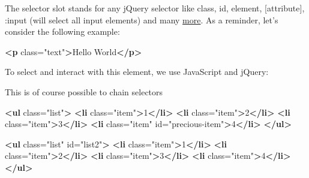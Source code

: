 \documentclass[]{book}
\newenvironment{Shaded}{\begin{snugshade}}{\end{snugshade}}
\newcommand{\AttributeTok}[1]{\textcolor[rgb]{0.77,0.63,0.00}{#1}}
\newcommand{\CommentTok}[1]{\textcolor[rgb]{0.56,0.35,0.01}{\textit{#1}}}
\newcommand{\KeywordTok}[1]{\textcolor[rgb]{0.13,0.29,0.53}{\textbf{#1}}}
\newcommand{\NormalTok}[1]{#1}
\newcommand{\OperatorTok}[1]{\textcolor[rgb]{0.81,0.36,0.00}{\textbf{#1}}}
\newcommand{\OtherTok}[1]{\textcolor[rgb]{0.56,0.35,0.01}{#1}}
\newcommand{\StringTok}[1]{\textcolor[rgb]{0.31,0.60,0.02}{#1}}
\newcommand{\VariableTok}[1]{\textcolor[rgb]{0.00,0.00,0.00}{#1}}
\begin{document}
The selector slot stands for any jQuery selector like class, id, element, {[}attribute{]}, :input (will select all input elements) and many \href{https://www.w3schools.com/jquery/jquery_ref_selectors.asp}{more}. As a reminder, let's consider the following example:

\begin{Shaded}
\begin{Highlighting}[]
\KeywordTok{<p}\OtherTok{ class=}\StringTok{"text"}\KeywordTok{>}\NormalTok{Hello World}\KeywordTok{</p>}
\end{Highlighting}
\end{Shaded}

To select and interact with this element, we use JavaScript and jQuery:

\begin{Shaded}
\end{Shaded}

This is of course possible to chain selectors

\begin{Shaded}
\begin{Highlighting}[]
\KeywordTok{<ul}\OtherTok{ class=}\StringTok{"list"}\KeywordTok{>}
  \KeywordTok{<li}\OtherTok{ class=}\StringTok{"item"}\KeywordTok{>}\NormalTok{1}\KeywordTok{</li>}
  \KeywordTok{<li}\OtherTok{ class=}\StringTok{"item"}\KeywordTok{>}\NormalTok{2}\KeywordTok{</li>}
  \KeywordTok{<li}\OtherTok{ class=}\StringTok{"item"}\KeywordTok{>}\NormalTok{3}\KeywordTok{</li>}
  \KeywordTok{<li}\OtherTok{ class=}\StringTok{"item"}\OtherTok{ id=}\StringTok{"precious-item"}\KeywordTok{>}\NormalTok{4}\KeywordTok{</li>}
\KeywordTok{</ul>}

\KeywordTok{<ul}\OtherTok{ class=}\StringTok{"list"}\OtherTok{ id=}\StringTok{"list2"}\KeywordTok{>}
  \KeywordTok{<li}\OtherTok{ class=}\StringTok{"item"}\KeywordTok{>}\NormalTok{1}\KeywordTok{</li>}
  \KeywordTok{<li}\OtherTok{ class=}\StringTok{"item"}\KeywordTok{>}\NormalTok{2}\KeywordTok{</li>}
  \KeywordTok{<li}\OtherTok{ class=}\StringTok{"item"}\KeywordTok{>}\NormalTok{3}\KeywordTok{</li>}
  \KeywordTok{<li}\OtherTok{ class=}\StringTok{"item"}\KeywordTok{>}\NormalTok{4}\KeywordTok{</li>}
\KeywordTok{</ul>}
\end{Highlighting}
\end{Shaded}
\end{document}
